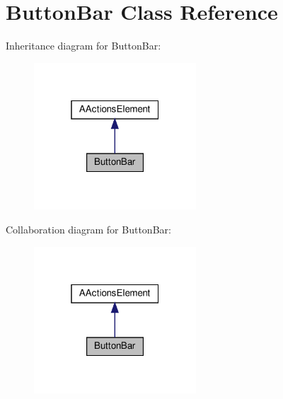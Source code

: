 \hypertarget{classButtonBar}{}\section{Button\+Bar Class Reference}
\label{classButtonBar}


Inheritance diagram for Button\+Bar\+:
\nopagebreak
\begin{figure}[H]
\begin{center}
\leavevmode
\includegraphics[width=172pt]{classButtonBar__inherit__graph}
\end{center}
\end{figure}


Collaboration diagram for Button\+Bar\+:
\nopagebreak
\begin{figure}[H]
\begin{center}
\leavevmode
\includegraphics[width=172pt]{classButtonBar__coll__graph}
\end{center}
\end{figure}

